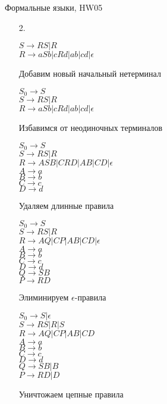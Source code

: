 \documentclass[12pt]{article}
\begin{document}
\begin{center} {\LARGE Формальные языки, HW05} \end{center}

\bigskip

\begin{enumerate}
\item[2.] \begin{myquote}
$S \to RS|R$\\
$R \to aSb|cRd|ab|cd|\epsilon$
\end{myquote}
Добавим новый начальный нетерминал
 \begin{myquote}
$S_0 \to S$\\
$S \to RS|R$\\
$R \to aSb|cRd|ab|cd|\epsilon$
\end{myquote}
Избавимся от неодиночных терминалов
\begin{myquote}
$S_0 \to S$\\
$S \to RS|R$\\
$R \to ASB|CRD|AB|CD|\epsilon$\\
$A \to a$\\
$B \to b$\\
$C \to c$\\
$D \to d$
\end{myquote}
Удаляем длинные правила
\begin{myquote}
$S_0 \to S$\\
$S \to RS|R$\\
$R \to AQ|CP|AB|CD|\epsilon$\\
$A \to a$\\
$B \to b$\\
$C \to c$\\
$D \to d$\\
$Q \to SB$\\
$P \to RD$
\end{myquote}
Элиминируем $\epsilon$-правила
\begin{myquote}
$S_0 \to S|\epsilon$\\
$S \to RS|R|S$\\
$R \to AQ|CP|AB|CD$\\
$A \to a$\\
$B \to b$\\
$C \to c$\\
$D \to d$\\
$Q \to SB|B$\\
$P \to RD|D$
\end{myquote}
Уничтожаем цепные правила\\
\begin{myquote}

\end{myquote}
\end{enumerate}
\end{document}
